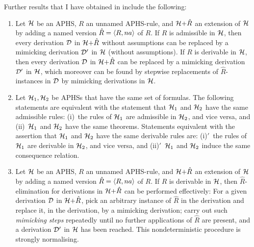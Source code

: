 \documentclass[envcountsame,runningheads]{llncs}
\newcommand{\pairlft}{{\langle}}
\newcommand{\pairrgt}{{\rangle}}
\newcommand{\pairsep}{{,\,}\nix}
\newcommand{\pairstr}[1]{\pairlft#1\pairrgt}
\newcommand{\pair}[2]{\pairstr{#1\pairsep#2}}
\newcommand{\nix}{}
\newcommand{\APHS}{A\hspace*{-0.3pt}P\hspace*{-0.6pt}H\hspace*{-0.4pt}S}
\newcommand{\aAPHS}{{\cal H}}
\newcommand{\extsysbyrule}[2]{{{#1}{+}{#2}}}
\newcommand{\aname}{{\mit na}}
\newcommand{\anamedRule}{{\hat{R}}}
\newcommand{\aunnamedRule}{R}
\newcommand{\aderiv}{{\cal D}}
\begin{document}
Further results that I have obtained in \cite{grab:2003} include the
following:
\begin{enumerate}
\item Let $\aAPHS$ be an \APHS, $\aunnamedRule$ an unnamed \APHS-rule,
    and $\extsysbyrule{\aAPHS}{\anamedRule}$ an extension of $\aAPHS$
    by adding a named version $\anamedRule = \pair{\aunnamedRule}{\aname}$
    of $\aunnamedRule$. 
    If $\aunnamedRule$ is admissible in $\aAPHS$,
    then every derivation $\aderiv$ in $\extsysbyrule{\aAPHS}{\anamedRule}$ 
    without assumptions can
    be replaced by a mimicking derivation $\aderiv'$
    in $\aAPHS$ (without assumptions).
    If $\aunnamedRule$ is derivable in $\aAPHS$,
    then every derivation $\aderiv$ in $\extsysbyrule{\aAPHS}{\anamedRule}$ can
    be replaced by a mimicking derivation $\aderiv'$ in $\aAPHS$, which
    moreover can be found by stepwise replacements 
    of $\anamedRule$-instances
    in $\aderiv$ by mimicking derivations in $\aAPHS$. 
\item Let $\aAPHS_1,\aAPHS_2$ be \APHS{s} that have the same set of formulas.
    The following statements are equivalent with 
    the statement that
    $\aAPHS_1$ and $\aAPHS_2$ have the same admissible rules:
    (i)~the rules of $\aAPHS_1$ are admissible in $\aAPHS_2$,
    and vice versa,
    and
    (ii)~$\aAPHS_1$ and $\aAPHS_2$ have the same theorems.
    Statements equivalent with the assertion that
    $\aAPHS_1$ and $\aAPHS_2$ have the same derivable rules
    are:
    (i)$'$~the rules of $\aAPHS_1$ are derivable in $\aAPHS_2$,
    and vice versa,
    and
    (ii)$'$~$\aAPHS_1$ and $\aAPHS_2$ induce the same consequence
    relation.
\item Let $\aAPHS$ be an \APHS, $\aunnamedRule$ an unnamed \APHS-rule,
    and $\extsysbyrule{\aAPHS}{\anamedRule}$ an extension of $\aAPHS$
    by adding a named version $\anamedRule = \pair{\aunnamedRule}{\aname}$
    of $\aunnamedRule$. 
    If $\aunnamedRule$ is derivable in $\aAPHS$,
    then $\anamedRule$-elimination for derivations in 
    $\extsysbyrule{\aAPHS}{\anamedRule}$ can be performed effectively: 
    For a given derivation $\aderiv$ in $\extsysbyrule{\aAPHS}{\anamedRule}$,
    pick an arbitrary instance of $\anamedRule$ in the derivation
    and replace it, in the derivation,  by a mimicking derivation;
    carry out such {\em mimicking steps\/} repeatedly until no
    further applications of $\anamedRule$ are present,
    and a derivation $\aderiv'$ in $\aAPHS$ has been reached. 
    This nondeterministic procedure is strongly normalising.
\end{enumerate}
\end{document}
